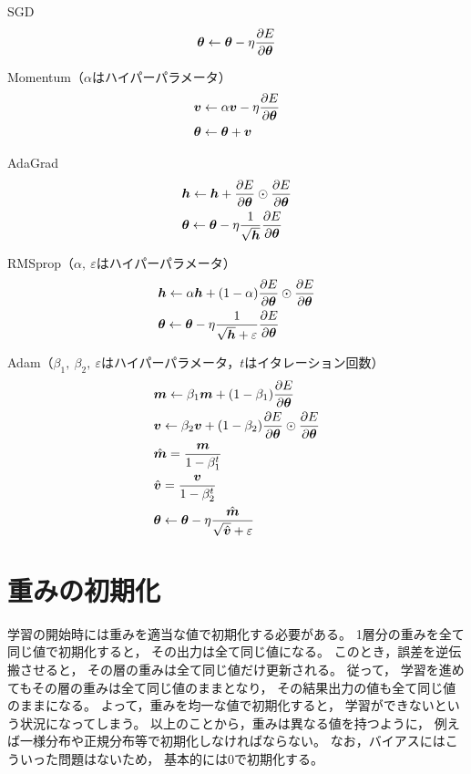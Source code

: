 \documentclass[class=jsarticle, crop=false, dvipdfmx, fleqn]{standalone}
\begin{document}
SGD
\begin{equation}
\bm{\theta} \leftarrow \bm{\theta} - \eta \pdv{E}{\bm{\theta}}
\end{equation}

Momentum（$\alpha$はハイパーパラメータ）
\begin{align}
& \bm{v} \leftarrow \alpha \bm{v} - \eta \pdv{E}{\bm{\theta}} \\
& \bm{\theta} \leftarrow \bm{\theta} + \bm{v}
\end{align}

AdaGrad
\begin{align}
& \bm{h} \leftarrow \bm{h} + \pdv{E}{\bm{\theta}} \odot \pdv{E}{\bm{\theta}} \\
& \bm{\theta} \leftarrow \bm{\theta} - \eta \frac{1}{\sqrt{\bm{h}}} \pdv{E}{\bm{\theta}}
\end{align}

RMSprop（$\alpha,\ \varepsilon$はハイパーパラメータ）
\begin{align}
& \bm{h} \leftarrow \alpha \bm{h} + (1 - \alpha) \pdv{E}{\bm{\theta}} \odot \pdv{E}{\bm{\theta}} \\
& \bm{\theta} \leftarrow \bm{\theta} - \eta \frac{1}{\sqrt{\bm{h}} + \varepsilon} \pdv{E}{\bm{\theta}}
\end{align}

Adam（$\beta_1,\ \beta_2,\ \varepsilon$はハイパーパラメータ，$t$はイタレーション回数）
\begin{align}
& \bm{m} \leftarrow \beta_1 \bm{m} + (1 - \beta_1) \pdv{E}{\bm{\theta}} \\
& \bm{v} \leftarrow \beta_2 \bm{v} + (1 - \beta_2) \pdv{E}{\bm{\theta}} \odot \pdv{E}{\bm{\theta}} \\
& \hat{\bm{m}} = \frac{\bm{m}}{1 - \beta_1^t} \\
& \hat{\bm{v}} = \frac{\bm{v}}{1 - \beta_2^t} \\
& \bm{\theta} \leftarrow \bm{\theta} - \eta \frac{\hat{\bm{m}}}{\sqrt{\hat{\bm{v}}} + \varepsilon}
\end{align}



\section{重みの初期化}

学習の開始時には重みを適当な値で初期化する必要がある。
1層分の重みを全て同じ値で初期化すると，
その出力は全て同じ値になる。
このとき，誤差を逆伝搬させると，
その層の重みは全て同じ値だけ更新される。
従って，
学習を進めてもその層の重みは全て同じ値のままとなり，
その結果出力の値も全て同じ値のままになる。
よって，重みを均一な値で初期化すると，
学習ができないという状況になってしまう。
以上のことから，重みは異なる値を持つように，
例えば一様分布や正規分布等で初期化しなければならない。
なお，バイアスにはこういった問題はないため，
基本的には0で初期化する。
\end{document}
